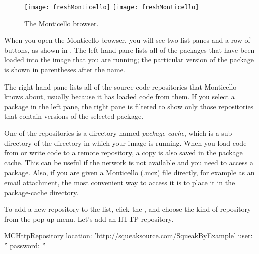 \documentclass[a4paper,10pt,twoside]{book}
\begin{document}
\begin{figure}[btp]
	\begin{center}
	\ifluluelse
		{\texttt{[image: freshMonticello]}}
		{\texttt{[image: freshMonticello]}}
	\end{center}
	\caption{The Monticello browser.}
	\label{fig:freshMonticello}
\end{figure}

When you open the Monticello browser, you will see two list panes and a row of buttons, as shown in .
The left-hand pane lists all of the packages that have been loaded into the image that you are running; the particular version of the package is shown in parentheses after the name.

The right-hand pane lists all of the source-code repositories that Monticello knows about, usually because it has loaded code from them.  If you select a package in the left pane, the right pane is filtered to show only those repositories that contain versions of the selected package.

One of the repositories is a directory named \emph{package-cache}, which is a sub-directory of the directory in which your image is running.  
When you load code from or write code to a remote repository, a copy is also saved in the package cache.  This can be useful if the network is not available and you need to access a package.  Also, if you are given a Monticello (.mcz) file directly, for example as an email attachment, the most convenient way to access it is to place it in the package-cache directory.

To add a new repository to the list, click the , and choose the kind of repository from the pop-up menu.  Let's add an HTTP repository.

\begin{code}{}
MCHttpRepository
	location: 'http://squeaksource.com/SqueakByExample'
	user: ''
	password: ''
\end{code}
\end{document}

